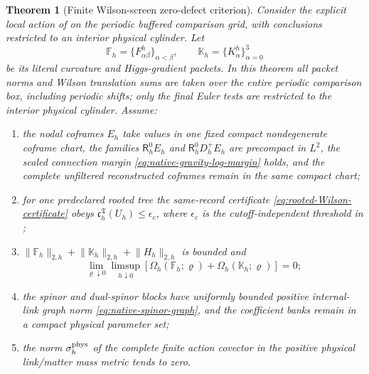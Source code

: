 \documentclass[11pt]{article}
\numberwithin{equation}{section}
\newtheorem{theorem}{Theorem}[section]
\theoremstyle{definition}
\theoremstyle{remark}
\newcommand{\norm}[1]{\lVert#1\rVert}
\begin{document}
\begin{theorem}[Finite Wilson-screen zero-defect criterion]
\label{thm:finite-Wilson-zero-defect}
Consider the explicit local action of  on the
periodic buffered comparison grid, with conclusions restricted to an
interior physical cylinder.  Let
\begin{equation}
 \mathbb F_h=\{F^h_{\alpha\beta}\}_{\alpha<\beta},
 \qquad
 \mathbb K_h=\{K^h_\alpha\}_{\alpha=0}^3
 \label{eq:literal-finite-bosonic-packets}
\end{equation}
be its literal curvature and Higgs-gradient packets.  In this theorem all
packet norms and Wilson translation sums are taken over the entire periodic
comparison box, including periodic shifts; only the final Euler tests are
restricted to the interior physical cylinder.  Assume:
\begin{enumerate}[label=\textup{(F\arabic*)},leftmargin=3.2em]
\item the nodal coframes $E_h$ take values in one fixed compact
      nondegenerate coframe chart, the families
      $\mathsf R_h^0E_h$ and $\mathsf R_h^0D_h^+E_h$ are precompact in
      $L^2$, the scaled connection margin
      \eqref{eq:native-gravity-log-margin} holds, and the complete unfiltered
      reconstructed coframes remain in the same compact chart;
\item for one predeclared rooted tree the same-record certificate
      \eqref{eq:rooted-Wilson-certificate} obeys
      $\mathfrak c_h^{\mathfrak T}(U_h)\le\epsilon_c$, where $\epsilon_c$
      is the cutoff-independent threshold in
      ;
\item $\norm{\mathbb F_h}_{2,h}+\norm{\mathbb K_h}_{2,h}
      +\norm{H_h}_{2,h}$ is bounded and
      \begin{equation}
       \lim_{\varrho\downarrow0}\limsup_{h\downarrow0}
       \left[\Omega_h(\mathbb F_h;\varrho)
             +\Omega_h(\mathbb K_h;\varrho)\right]=0;
       \label{eq:two-finite-Wilson-screens}
      \end{equation}
\item the spinor and dual-spinor blocks have uniformly bounded positive
      internal-link graph norm \eqref{eq:native-spinor-graph}, and the
      coefficient banks remain in a compact physical parameter set;
\item the norm $\sigma_h^{\rm phys}$ of the complete finite action covector
      in the positive physical link/matter mass metric tends to zero.
\end{enumerate}

\end{theorem}
\end{document}
